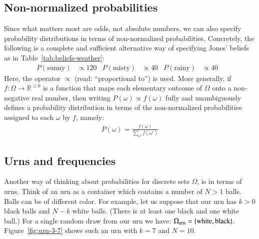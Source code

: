 \documentclass[nobib,nofonts]{tufte-handout}
\begin{document}
\subsection{Non-normalized probabilities}

Since what matters most are odds, not absolute numbers, we can also specify probability distributions in terms of non-normalized probabilities.
Concretely, the following is a complete and sufficient alternative way of specifying Jones' beliefs as in Table~\ref{tab:beliefs-weather}:
\begin{align*}
  P(\text{sunny})   & \propto 120
  & P(\text{misty}) & \propto 40
  & P(\text{rainy}) & \propto 40 &
\end{align*}
Here, the operator $\propto$ (read: ``proportional to'') is used.
More generally, if $f \colon \Omega \rightarrow \mathbb{R}^{\ge 0}$ is a function that maps each elementary outcome of $\Omega$ onto a non-negative real number, then writing $P(\omega) \propto f(\omega)$ fully and unambiguously defines a probability distribution in terms of the non-normalized probabilities assigned to each $\omega$ by $f$, namely:
\begin{align*}
  P(\omega) = \frac{f(\omega)}{\sum_{\omega'}f(\omega')}
\end{align*}




\subsection{Urns and frequencies}
\label{sec:urns-frequencies}

Another way of  thinking about probabilities for discrete sets $\Omega$, is in terms of urns.
Think of an urn as a container which contains a number of $N > 1$ balls. Balls can be of
different color. For example, let us suppose that our urn has $k > 0$ black balls and $N-k$
white balls. (There is at least one black and one white ball.) For a single random draw from
our urn we have: $\Omega_{\text{urn}} = \left\{\text{white}, \text{black}\right\}$.
Figure~\ref{fig:urn-3-7} shows such an urn with $k=7$ and $N=10$.
\end{document}
